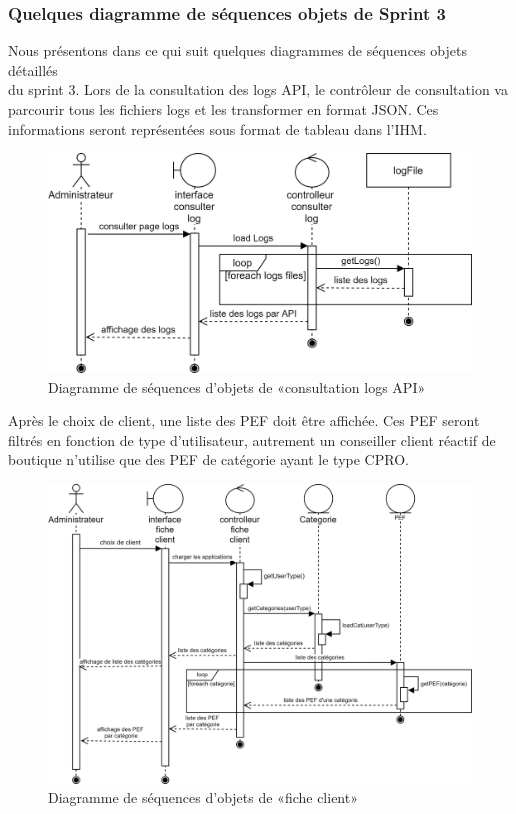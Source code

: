 \subsubsection{Quelques diagramme de séquences objets de Sprint 3}
Nous présentons dans ce qui suit quelques diagrammes de séquences objets détaillés \\du sprint 3.
Lors de la consultation des logs API, le contrôleur de consultation va parcourir tous les fichiers logs et les transformer en format JSON. Ces informations seront représentées sous format de tableau dans l'IHM. 
	\begin{figure}[H]
		\centering
		\includegraphics[width=0.7\linewidth]{"img/conception/sequences/sprint 3/log-api-obj"}
		\caption[Diagramme de séquences d’objets de «consultation logs API»]{Diagramme de séquences d’objets de «consultation logs API»}
		\label{fig:log-api-obj}
	\end{figure}
	\newpage
{} 
Après le choix de client, une liste des PEF doit être affichée. Ces PEF seront filtrés en fonction de type d'utilisateur, autrement un conseiller client réactif de boutique n'utilise que des PEF de catégorie ayant le type CPRO. 
	\begin{figure}[H]
		\centering
		\includegraphics[width=0.7\linewidth]{"img/conception/sequences/sprint 3/fiche-client-obj"}
		\caption[Diagramme de séquences d’objets de «fiche client»]{Diagramme de séquences d’objets de «fiche client»}
		\label{fig:fiche-client-obj}
	\end{figure}

